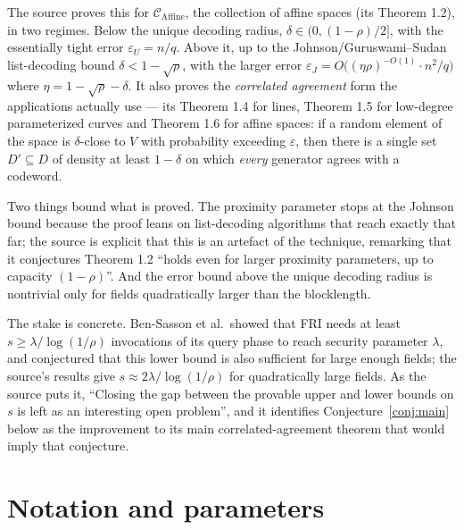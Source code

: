 \documentclass{aicr-conjecture}
\newcommand{\eps}{\varepsilon}
\newcommand{\Caff}{\mathcal{C}_{\mathrm{Affine}}}
\begin{document}
The source proves this for $\Caff$, the collection of affine spaces
(its Theorem 1.2), in two regimes. Below the unique decoding radius,
$\delta \in (0, (1-\rho)/2]$, with the essentially tight error $\eps_{U}
= n/q$. Above it, up to the Johnson/Guruswami--Sudan list-decoding bound
$\delta < 1 - \sqrt{\rho}$, with the larger error $\eps_{J} =
O\bigl((\eta\rho)^{-O(1)} \cdot n^{2}/q\bigr)$ where $\eta = 1 -
\sqrt{\rho} - \delta$. It also proves the \emph{correlated agreement}
form the applications actually use --- its Theorem 1.4 for lines,
Theorem 1.5 for low-degree parameterized curves and Theorem 1.6 for
affine spaces: if a random element of the space is $\delta$-close to $V$
with probability exceeding $\eps$, then there is a single set $D'
\subseteq D$ of density at least $1 - \delta$ on which \emph{every}
generator agrees with a codeword.

Two things bound what is proved. The proximity parameter stops at the
Johnson bound because the proof leans on list-decoding algorithms that
reach exactly that far; the source is explicit that this is an artefact
of the technique, remarking that it conjectures Theorem 1.2 ``holds even
for larger proximity parameters, up to capacity $(1-\rho)$''. And the
error bound above the unique decoding radius is nontrivial only for
fields quadratically larger than the blocklength.

The stake is concrete. Ben-Sasson et al.\ showed that FRI needs at least
$s \ge \lambda / \log(1/\rho)$ invocations of its query phase to reach
security parameter $\lambda$, and conjectured that this lower bound is
also sufficient for large enough fields; the source's results give $s
\approx 2\lambda/\log(1/\rho)$ for quadratically large fields. As the
source puts it, ``Closing the gap between the provable upper and lower
bounds on $s$ is left as an interesting open problem'', and it identifies
Conjecture~\ref{conj:main} below as the improvement to its main
correlated-agreement theorem that would imply that conjecture.

\section{Notation and parameters}\label{sec:notation}
\end{document}
